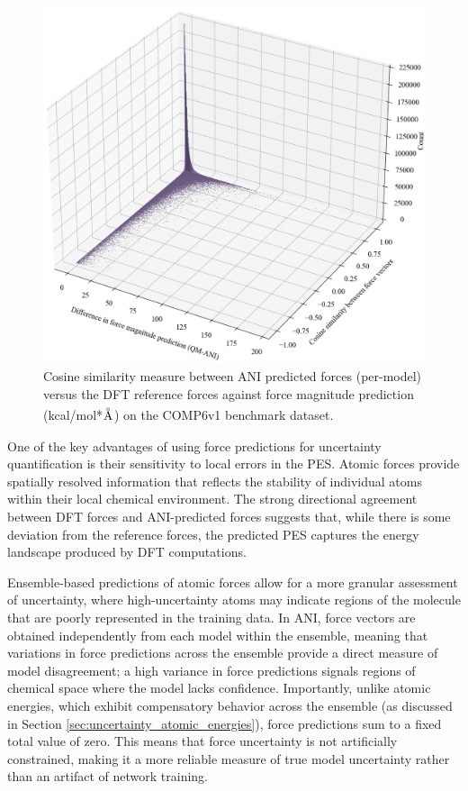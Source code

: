 \begin{figure}[H]
    \centering
    \includegraphics[width=1\linewidth]{Images/2xr_forces/2xr_comp6v1_force-cosine_sim-bar3d.png}
    \caption[3D histogram of cosine similarity measure of predicted atomic force vectors]{
    Cosine similarity measure between ANI predicted forces (per-model) versus the DFT reference forces against force magnitude prediction (kcal/mol*$\angstrom$) on the COMP6v1 benchmark dataset.
    }
    \label{fig:2xr_comp6v1-forces-cos_sim}
\end{figure}


One of the key advantages of using force predictions for uncertainty quantification is their sensitivity to local errors in the PES. 
Atomic forces provide spatially resolved information that reflects the stability of individual atoms within their local chemical environment. 
The strong directional agreement between DFT forces and ANI-predicted forces suggests that, while there is some deviation from the reference forces, the predicted PES captures the energy landscape produced by DFT computations.

Ensemble-based predictions of atomic forces allow for a more granular assessment of uncertainty, where high-uncertainty atoms may indicate regions of the molecule that are poorly represented in the training data. 
In ANI, force vectors are obtained independently from each model within the ensemble, meaning that variations in force predictions across the ensemble provide a direct measure of model disagreement; a high variance in force predictions signals regions of chemical space where the model lacks confidence.
Importantly, unlike atomic energies, which exhibit compensatory behavior across the ensemble (as discussed in Section \ref{sec:uncertainty_atomic_energies}), force predictions sum to a fixed total value of zero. 
This means that force uncertainty is not artificially constrained, making it a more reliable measure of true model uncertainty rather than an artifact of network training.

